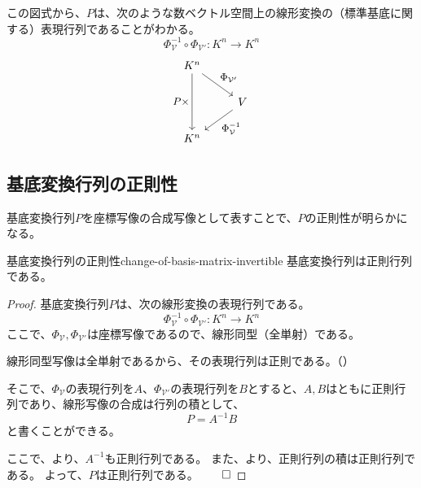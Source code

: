 \documentclass[../../../topic_linear-algebra]{subfiles}
\begin{document}
この図式から、$P$は、次のような数ベクトル空間上の線形変換の（標準基底に関する）表現行列であることがわかる。
\begin{equation*}
  \Phi_{\mathcal{V}}^{-1} \circ \Phi_{\mathcal{V}'} \colon K^n \to K^n
\end{equation*}
\begin{equation*}
  \begin{tikzcd}[every label/.append style = {font = \small}]
    K^n \arrow[dd, "P\times"'] \arrow[rd,"{\Phi_{\mathcal{V}'}}"] & \\
    & V \arrow[ld,"{\Phi_{\mathcal{V}}^{-1}}"] \\
    K^n &
  \end{tikzcd}
\end{equation*}

\subsection{基底変換行列の正則性}

基底変換行列$P$を座標写像の合成写像として表すことで、$P$の正則性が明らかになる。

\begin{theorem}{基底変換行列の正則性}{change-of-basis-matrix-invertible}
  基底変換行列は正則行列である。
\end{theorem}

\begin{proof}
  基底変換行列$P$は、次の線形変換の表現行列である。
  \begin{equation*}
    \Phi_{\mathcal{V}}^{-1} \circ \Phi_{\mathcal{V}'} \colon K^n \to K^n
  \end{equation*}
  ここで、$\Phi_{\mathcal{V}}, \Phi_{\mathcal{V}'}$は座標写像であるので、線形同型（全単射）である。
  
  \br
  
  線形同型写像は全単射であるから、その表現行列は正則である。（）
  
  そこで、$\Phi_{\mathcal{V}}$の表現行列を$A$、$\Phi_{\mathcal{V}'}$の表現行列を$B$とすると、$A,B$はともに正則行列であり、線形写像の合成は行列の積として、
  \begin{equation*}
    P = A^{-1} B
  \end{equation*}
  と書くことができる。
  
  \br
  
  ここで、より、$A^{-1}$も正則行列である。
  また、より、正則行列の積は正則行列である。
  よって、$P$は正則行列である。$\qed$
\end{proof}
\end{document}

